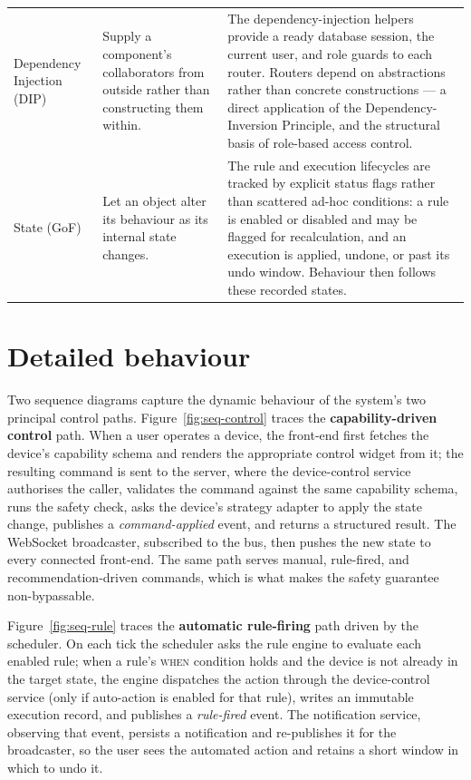 \begin{table}[htbp]
\begin{tabularx}{\textwidth}{L{0.16\textwidth} L{0.30\textwidth} Y}
Dependency Injection (DIP) &
Supply a component's collaborators from outside rather than constructing them within. &
The dependency-injection helpers provide a ready database session, the current user, and
role guards to each router. Routers depend on abstractions rather than concrete
constructions --- a direct application of the Dependency-Inversion Principle, and the
structural basis of role-based access control. \\
State (GoF) &
Let an object alter its behaviour as its internal state changes. &
The rule and execution lifecycles are tracked by explicit status flags rather than
scattered ad-hoc conditions: a rule is enabled or disabled and may be flagged for
recalculation, and an execution is applied, undone, or past its undo window. Behaviour
then follows these recorded states. \\
\bottomrule
\end{tabularx}
\end{table}

\section{Detailed behaviour}
\label{sec:behaviour}

Two sequence diagrams capture the dynamic behaviour of the system's two principal
control paths. Figure~\ref{fig:seq-control} traces the \textbf{capability-driven
control} path. When a user operates a device, the front-end first fetches the
device's capability schema and renders the appropriate control widget from it; the
resulting command is sent to the server, where the device-control service authorises
the caller, validates the command against the same capability schema, runs the safety
check, asks the device's strategy adapter to apply the state change, publishes a
\emph{command-applied} event, and returns a structured result. The WebSocket
broadcaster, subscribed to the bus, then pushes the new state to every connected
front-end. The same path serves manual, rule-fired, and recommendation-driven
commands, which is what makes the safety guarantee non-bypassable.


Figure~\ref{fig:seq-rule} traces the \textbf{automatic rule-firing} path driven by
the scheduler. On each tick the scheduler asks the rule engine to evaluate each
enabled rule; when a rule's \textsc{when} condition holds and the device is not
already in the target state, the engine dispatches the action through the
device-control service (only if auto-action is enabled for that rule), writes an
immutable execution record, and publishes a \emph{rule-fired} event. The
notification service, observing that event, persists a notification and re-publishes
it for the broadcaster, so the user sees the automated action and retains a short
window in which to undo it.

